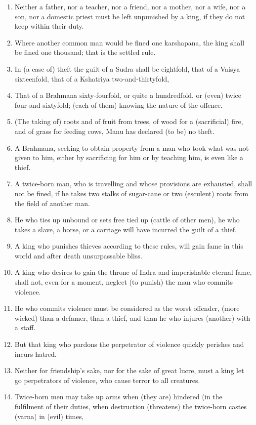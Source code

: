 \begin{enumerate}
\item Neither a father, nor a teacher, nor a friend, nor a mother, nor a wife, nor a son, nor a domestic priest must be left unpunished by a king, if they do not keep within their duty.
\item Where another common man would be fined one karshapana, the king shall be fined one thousand; that is the settled rule.
\item In (a case of) theft the guilt of a Sudra shall be eightfold, that of a Vaisya sixteenfold, that of a Kshatriya two-and-thirtyfold,
\item That of a Brahmana sixty-fourfold, or quite a hundredfold, or (even) twice four-and-sixtyfold; (each of them) knowing the nature of the offence.
\item (The taking of) roots and of fruit from trees, of wood for a (sacrificial) fire, and of grass for feeding cows, Manu has declared (to be) no theft.
\item A Brahmana, seeking to obtain property from a man who took what was not given to him, either by sacrificing for him or by teaching him, is even like a thief.
\item A twice-born man, who is travelling and whose provisions are exhausted, shall not be fined, if he takes two stalks of sugar-cane or two (esculent) roots from the field of another man.
\item He who ties up unbound or sets free tied up (cattle of other men), he who takes a slave, a horse, or a carriage will have incurred the guilt of a thief.
\item A king who punishes thieves according to these rules, will gain fame in this world and after death unsurpassable bliss.
\item A king who desires to gain the throne of Indra and imperishable eternal fame, shall not, even for a moment, neglect (to punish) the man who commits violence.
\item He who commits violence must be considered as the worst offender, (more wicked) than a defamer, than a thief, and than he who injures (another) with a staff.
\item But that king who pardons the perpetrator of violence quickly perishes and incurs hatred.
\item Neither for friendship's sake, nor for the sake of great lucre, must a king let go perpetrators of violence, who cause terror to all creatures.
\item Twice-born men may take up arms when (they are) hindered (in the fulfilment of their duties, when destruction (threatens) the twice-born castes (varna) in (evil) times,

\end{enumerate}
